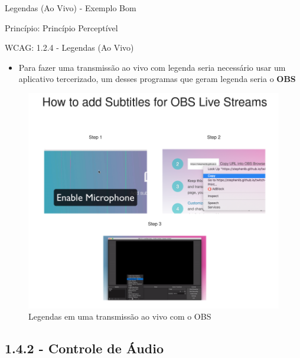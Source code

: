 \documentclass{beamer}
\begin{document}
\begin{frame}{Legendas (Ao Vivo) - Exemplo Bom}

Princípio: Princípio Perceptível

WCAG: 1.2.4 - Legendas (Ao Vivo)

\begin{itemize}
	\item Para fazer uma transmissão ao vivo com legenda seria necessário usar um aplicativo tercerizado, um desses programas que geram legenda seria o \textbf{OBS}
\end{itemize}
\begin{figure}
    \centering
    \includegraphics[scale=0.2]{images/subtitle.png}
    \caption{Legendas em uma transmissão ao vivo com o OBS}
\end{figure}
\end{frame}

\subsection{1.4.2 - Controle de Áudio}
\end{document}
